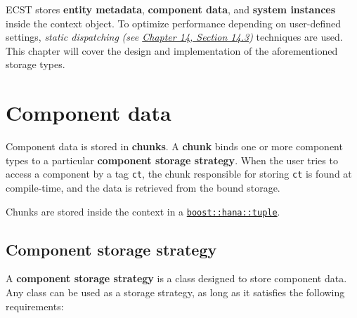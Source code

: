 \documentclass[twoside, 12pt, a4paper, openany]{book}
\begin{document}
ECST stores \textbf{entity metadata}, \textbf{component data}, and
\textbf{system instances} inside the context object. To optimize
performance depending on user-defined settings, \emph{static
dispatching} \emph{(see
\protect\hyperlink{appendix_static_dispatching}{Chapter 14, Section
14.3})} techniques are used. This chapter will cover the design and
implementation of the aforementioned storage types.

\hypertarget{storage_component}{\section{Component
data}\label{storage_component}}

Component data is stored in \textbf{chunks}. A \textbf{chunk} binds one
or more component types to a particular \textbf{component storage
strategy}. When the user tries to access a component by a tag
\texttt{ct},
the chunk responsible for storing
\texttt{ct}
is found at compile-time, and the data is retrieved from the bound
storage.

Chunks are stored inside the context in a
\href{http://www.boost.org/doc/libs/1_61_0/libs/hana/doc/html/structboost_1_1hana_1_1tuple.html}{\texttt{boost::hana::tuple}}.

\hypertarget{storage_comp_strategy}{\subsection{Component storage
strategy}\label{storage_comp_strategy}}

A \textbf{component storage strategy} is a class designed to store
component data. Any class can be used as a storage strategy, as long as
it satisfies the following requirements:
\end{document}
